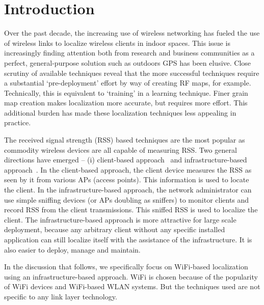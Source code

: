 \section{Introduction}
\label{sec:introduction}

Over the past decade, the increasing use of wireless networking has fueled the 
use of wireless links to localize wireless clients in indoor spaces. This issue
is increasingly finding attention both from research and business communities 
as a perfect, general-purpose solution such as outdoors GPS has been elusive. Close scrutiny 
of available techniques reveal that the more successful techniques require a substantial
`pre-deployment' effort by way of creating RF maps, for example. 
Technically, this is equivalent
to `training' in a learning technique. Finer grain map creation makes localization 
more accurate, but requires more effort. This additional burden has made these localization techniques less appealing in practice. 

The received signal strength (RSS) based techniques are the most popular as commodity wireless devices are all capable of measuring RSS. Two general directions have emerged -- (i) client-based approach~\cite{Haeberlen:2004:PRL:1023720.1023728, Gwon:2004:ECC:1023783.1023786, Youssef:2008:HLD:1399551.1399558, Chintalapudi:2010:ILW:1859995.1860016, Ladd:2002:RLS:570645.570674, Youssef:2003:WLD:826025.826335} and infrastructure-based approach~\cite{Moraes:2006:CWL:1164783.1164799, Lim:2010:ZIL:1741400.1741464, Tao:2003:WLL:941311.941314, Krishnan04asystem}. In the client-based approach, the client device measures the RSS as seen by it from various APs (access points). This information is used to locate the client. In the infrastructure-based approach, the network administrator can use simple sniffing devices (or APs doubling as sniffers) to monitor clients and record RSS from the client transmissions.  This sniffed RSS is used to localize the client. The infrastructure-based approach is more attractive for large scale deployment, because
any arbitrary client without any specific installed application can still localize itself
with the assistance of the infrastructure. It is also easier to deploy, manage and maintain. 

In the discussion that follows, we specifically focus on WiFi-based localization using
an infrastructure-based approach. WiFi is chosen because of the popularity of WiFi devices and WiFi-based WLAN systems. But the techniques used are not specific to any link layer technology. 


